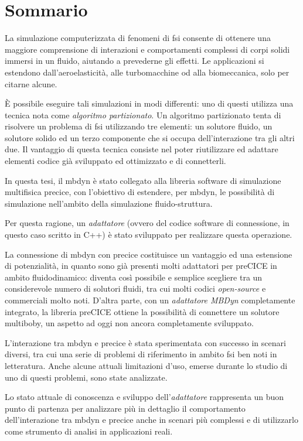 \chapter*{Sommario}
\label{cha:sommario}


La simulazione computerizzata di fenomeni di \acrfull{fsi} consente di ottenere una maggiore comprensione di interazioni e comportamenti complessi di corpi solidi immersi in un fluido, aiutando a prevederne gli effetti. Le applicazioni si estendono dall'aeroelasticità, alle turbomacchine od alla biomeccanica, solo per citarne alcune.

\`E possibile eseguire tali simulazioni in modi differenti: uno di questi utilizza una tecnica nota come \textit{algoritmo partizionato}. Un algoritmo partizionato tenta di risolvere un problema di \acrshort{fsi} utilizzando tre elementi: un solutore fluido, un solutore solido ed un terzo componente che si occupa dell'interazione tra gli altri due. Il vantaggio di questa tecnica consiste nel poter riutilizzare ed adattare elementi codice già sviluppato ed ottimizzato e di connetterli. 

In questa tesi, il \acrfull{mbdyn} è stato collegato alla libreria software di simulazione multifisica \acrfull{precice}, con l'obiettivo di estendere, per \acrshort{mbdyn}, le possibilità di simulazione nell'ambito della simulazione fluido-struttura.

Per questa ragione, un \textit{adattatore} (ovvero del codice software di connessione, in questo caso scritto in C++) è stato sviluppato per realizzare questa operazione.

La connessione di \acrshort{mbdyn} con \acrshort{precice} costituisce un vantaggio ed una estensione di potenzialità, in quanto sono già presenti molti adattatori per preCICE in ambito fluidodinamico: diventa così possibile e semplice scegliere tra un considerevole numero di solutori fluidi, tra cui molti codici \textit{open-source} e commerciali molto noti. D'altra parte, con un \textit{adattatore MBDyn} completamente integrato, la libreria preCICE ottiene la possibilità di connettere un solutore multiboby, un aspetto ad oggi non ancora completamente sviluppato.

L'interazione tra \acrshort{mbdyn} e \acrshort{precice} è stata sperimentata con successo in scenari diversi, tra cui una serie di problemi di riferimento in ambito \acrshort{fsi} ben noti in letteratura. Anche alcune attuali limitazioni d'uso, emerse durante lo studio di uno di questi problemi, sono state analizzate. 

Lo stato attuale di conoscenza e sviluppo dell'\textit{adattatore} rappresenta un buon punto di partenza per analizzare più in dettaglio il comportamento dell'interazione tra \acrshort{mbdyn} e \acrshort{precice} anche in scenari più complessi e di utilizzarlo come strumento di analisi in applicazioni reali.


\vspace{5mm}


